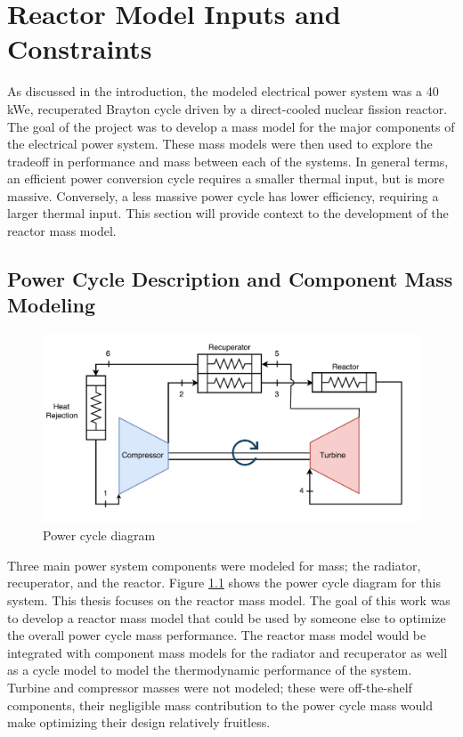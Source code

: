 \chapter{Reactor Model Inputs and Constraints}
As discussed in the introduction, the modeled electrical power system was a 40
kWe, recuperated Brayton cycle driven by a direct-cooled nuclear fission reactor. The goal
of the project was to develop a mass model for the major components of the
electrical power system. These mass models were then used to explore the
tradeoff in performance and mass between each of the systems. In general terms,
an efficient power conversion cycle requires a smaller thermal input, but is
more massive. Conversely, a less massive power cycle has lower efficiency,
requiring a larger thermal input. This section will provide context to the
development of the reactor mass model.

\section{Power Cycle Description and Component Mass Modeling}

\begin{figure}[h]
    \centering
    \includegraphics[width=5in]{../images/power_cycle.png}
\caption{Power cycle diagram}
\label{fig:power_cycle}
\end{figure}

Three main power system components were modeled for
mass; the radiator, recuperator, and the reactor. 
Figure \ref{fig:power_cycle} shows the power cycle diagram for this system.
This thesis focuses on the reactor mass model. The goal of this work was to
develop a reactor mass model that could be used by someone else to optimize 
the overall power cycle mass performance. The reactor mass model would be 
integrated with component mass models for the radiator and recuperator
as well as a cycle model to model the thermodynamic performance of the system.
Turbine and compressor masses were not modeled; these were off-the-shelf
components, their
negligible mass contribution to the power cycle mass would make optimizing their
design relatively fruitless.

